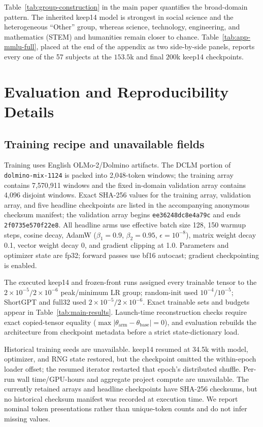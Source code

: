 Table~\ref{tab:group-construction} in the main paper quantifies the
broad-domain pattern. The inherited keep14 model is strongest in social
science and the heterogeneous ``Other'' group, whereas science, technology,
engineering, and mathematics (STEM) and humanities remain closer to chance.
Table~\ref{tab:app-mmlu-full}, placed at the
end of the appendix as two side-by-side panels, reports every one of the 57
subjects at the $153.5$k and final $200$k keep14 checkpoints.

\section{Evaluation and Reproducibility Details}
\label{app:repro}

\subsection{Training recipe and unavailable fields}
Training uses English OLMo-2/Dolmino artifacts. The DCLM portion of
\texttt{dolmino-mix-1124} is packed into 2,048-token windows; the training array
contains 7,570,911 windows and the fixed in-domain validation array contains
4,096 disjoint windows. Exact SHA-256 values for the training array, validation array, and five
headline checkpoints are listed in the accompanying anonymous checksum
manifest; the validation array begins \texttt{ee36248dc8e4a79c} and ends
\texttt{2f0735e570f22e8}. All headline arms use effective
batch size 128, 150 warmup steps, cosine decay, AdamW
($\beta_1{=}0.9$, $\beta_2{=}0.95$, $\epsilon{=}10^{-8}$), matrix weight decay
0.1, vector weight decay 0, and gradient clipping at 1.0. Parameters and
optimizer state are fp32; forward passes use bf16 autocast; gradient
checkpointing is enabled.

The executed keep14 and frozen-front runs assigned every trainable tensor to
the $2\times10^{-5}/2\times10^{-6}$ peak/minimum LR group; random-init used
$10^{-4}/10^{-5}$; ShortGPT and full32 used
$2\times10^{-5}/2\times10^{-6}$. Exact trainable sets and budgets appear in
Table~\ref{tab:main-results}. Launch-time reconstruction checks require exact
copied-tensor equality ($\max|\theta_{\mathrm{arm}}-\theta_{\mathrm{base}}|=0$),
and evaluation rebuilds the architecture from checkpoint metadata before a
strict state-dictionary load.

Historical training seeds are unavailable. keep14 resumed at 34.5k with model,
optimizer, and RNG state restored, but the checkpoint omitted the within-epoch
loader offset; the resumed iterator restarted that epoch's distributed shuffle.
Per-run wall time/GPU-hours and aggregate project compute are unavailable.
The currently retained arrays and headline checkpoints have SHA-256 checksums,
but no historical checksum manifest was recorded at execution time. We report nominal token presentations rather than unique-token counts
and do not infer missing values.

